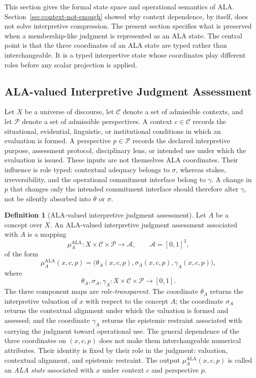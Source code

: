 \documentclass[reqno,final]{amsart}
\theoremstyle{definition}
\newtheorem{definition}{Definition}
\theoremstyle{plain}
\theoremstyle{remark}
\providecommand{\cA}{\mathcal{A}}
\providecommand{\cC}{\mathcal{C}}
\providecommand{\cP}{\mathcal{P}}
\begin{document}
This section gives the formal state space and operational semantics of ALA. Section~\ref{sec:context-not-enough} showed why context dependence, by itself, does not solve interpretive compression. The present section specifies what is preserved when a membership-like judgment is represented as an ALA state. The central point is that the three coordinates of an ALA state are typed rather than interchangeable. It is a typed interpretive state whose coordinates play different roles before any scalar projection is applied.

\subsection{ALA-valued Interpretive Judgment Assessment}
Let \(X\) be a universe of discourse, let \(\cC\) denote a set of admissible contexts, and let \(\cP\) denote a set of admissible perspectives. A context \(c\in\cC\) records the situational, evidential, linguistic, or institutional conditions in which an evaluation is formed. A perspective \(p\in\cP\) records the declared interpretive purpose, assessment protocol, disciplinary lens, or intended use under which the evaluation is issued. These inputs are not themselves ALA coordinates. Their influence is role typed: contextual adequacy belongs to \(\sigma\), whereas stakes, irreversibility, and the operational commitment interface belong to \(\gamma\). A change in \(p\) that changes only the intended commitment interface should therefore alter \(\gamma\), not be silently absorbed into \(\theta\) or \(\sigma\).

\begin{definition}[ALA-valued interpretive judgment assessment]
\label{def:ala-valued}
Let \(A\) be a concept over \(X\). An ALA-valued interpretive judgment assessment associated with \(A\) is a mapping
\[
\mu_A^{\mathrm{ALA}}:X\times\cC\times\cP\to\cA,
\qquad
\cA=[0,1]^3,
\]
of the form
\begin{equation}
\mu_A^{\mathrm{ALA}}(x,c,p)
=
\bigl(\theta_A(x,c,p),\sigma_A(x,c,p),\gamma_A(x,c,p)\bigr),
\label{eq:ala-valued-output}
\end{equation}
where
\[
\theta_A,\sigma_A,\gamma_A:X\times\cC\times\cP\to[0,1].
\]
The three component maps are \emph{role-transparent}. The coordinate \(\theta_A\) returns the interpretive valuation of \(x\) with respect to the concept \(A\); the coordinate \(\sigma_A\) returns the contextual alignment under which the valuation is formed and assessed; and the coordinate \(\gamma_A\) returns the epistemic restraint associated with carrying the judgment toward operational use. The general dependence of the three coordinates on \((x,c,p)\) does not make them interchangeable numerical attributes. Their identity is fixed by their role in the judgment: valuation, contextual alignment, and epistemic restraint. The output \(\mu_A^{\mathrm{ALA}}(x,c,p)\) is called an \emph{ALA state} associated with \(x\) under context \(c\) and perspective \(p\).
\end{definition}
\end{document}
